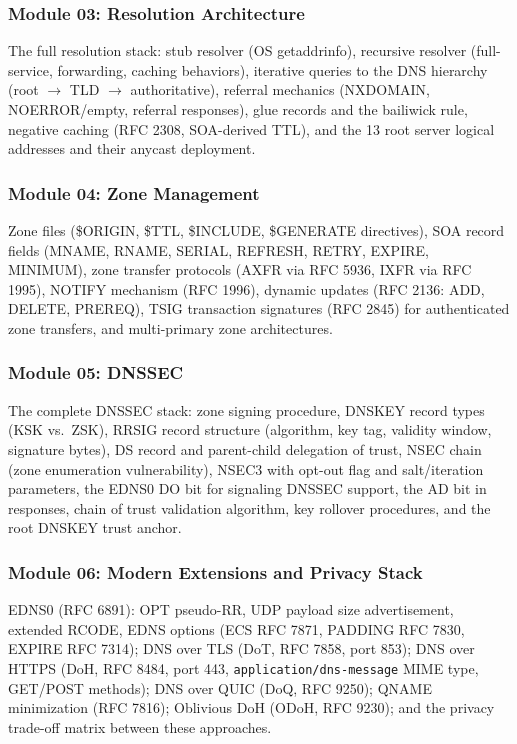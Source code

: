 \documentclass[11pt,letterpaper]{article}
\begin{document}
\subsubsection{Module 03: Resolution Architecture}
The full resolution stack: stub resolver (OS getaddrinfo), recursive resolver (full-service, forwarding, caching behaviors), iterative queries to the DNS hierarchy (root $\to$ TLD $\to$ authoritative), referral mechanics (NXDOMAIN, NOERROR/empty, referral responses), glue records and the bailiwick rule, negative caching (RFC 2308, SOA-derived TTL), and the 13 root server logical addresses and their anycast deployment.

\subsubsection{Module 04: Zone Management}
Zone files (\$ORIGIN, \$TTL, \$INCLUDE, \$GENERATE directives), SOA record fields (MNAME, RNAME, SERIAL, REFRESH, RETRY, EXPIRE, MINIMUM), zone transfer protocols (AXFR via RFC 5936, IXFR via RFC 1995), NOTIFY mechanism (RFC 1996), dynamic updates (RFC 2136: ADD, DELETE, PREREQ), TSIG transaction signatures (RFC 2845) for authenticated zone transfers, and multi-primary zone architectures.

\subsubsection{Module 05: DNSSEC}
The complete DNSSEC stack: zone signing procedure, DNSKEY record types (KSK vs.\ ZSK), RRSIG record structure (algorithm, key tag, validity window, signature bytes), DS record and parent-child delegation of trust, NSEC chain (zone enumeration vulnerability), NSEC3 with opt-out flag and salt/iteration parameters, the EDNS0 DO bit for signaling DNSSEC support, the AD bit in responses, chain of trust validation algorithm, key rollover procedures, and the root DNSKEY trust anchor.

\subsubsection{Module 06: Modern Extensions and Privacy Stack}
EDNS0 (RFC 6891): OPT pseudo-RR, UDP payload size advertisement, extended RCODE, EDNS options (ECS RFC 7871, PADDING RFC 7830, EXPIRE RFC 7314); DNS over TLS (DoT, RFC 7858, port 853); DNS over HTTPS (DoH, RFC 8484, port 443, \texttt{application/dns-message} MIME type, GET/POST methods); DNS over QUIC (DoQ, RFC 9250); QNAME minimization (RFC 7816); Oblivious DoH (ODoH, RFC 9230); and the privacy trade-off matrix between these approaches.
\end{document}

